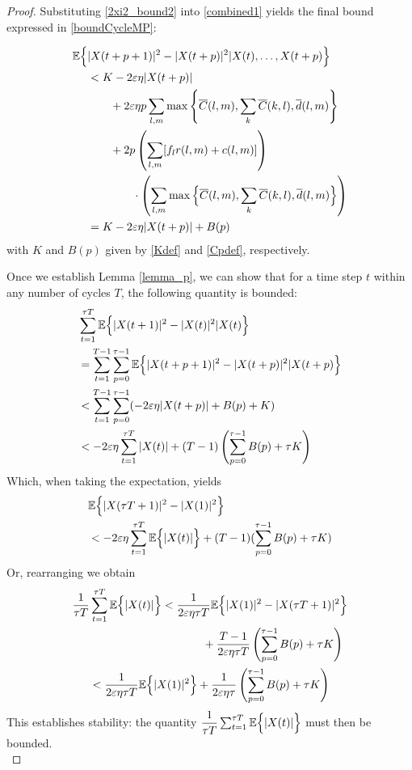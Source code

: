 \begin{proof}
Substituting \eqref{2xi2_bound2} into \eqref{combined1} yields the final bound expressed in
 \eqref{boundCycleMP}:

\begin{align} \nonumber
\mathbb{E}\Big\{ &\vert X(t + p +  1)\vert^2 - \vert  X(t + p)\vert^2 \vert X(t),\ldots,X(t + p) \Big\}  \\ \nonumber
&<  K  -2 \varepsilon \eta \vert X(t + p) \vert \\ \nonumber
&\qquad + 2\varepsilon \eta p \sum_{l,m} \max\left\{ \overline{C}(l,m),\sum_{k}\overline{C}(k,l),\overline d(l,m) \right\}  \\ \nonumber
&  \qquad  + 2 p \left(\sum_{l,m}[f_{l}r(l,m) + c(l,m)]\right) \\ \nonumber
& \qquad \qquad \cdot \left( \sum_{l,m} \max\Big\{  \overline{C}(l,m), \sum_{k}\overline{C}(k,l), \overline{d}(l,m)\Big\} \right) \\
&= K  -2 \varepsilon \eta \vert X(t + p) \vert + B(p)
\end{align}
with $K$ and $B(p)$ given by \eqref{Kdef} and \eqref{Cpdef}, respectively. 



Once we establish Lemma \ref{lemma_p}, we can show that for a time step $t$ within any number of cycles $T$, the following quantity is bounded:
\begin{align} \nonumber 
&\sum_{t = 1}^{\tau T} \expectation{\vert X(t + 1)\vert^2 - \vert X(t)\vert^2 \vert X(t)}\\ \nonumber
&=\sum_{t=1}^{T-1} \sum_{p=0 }^{\tau - 1} \expectation{\vert X(t + p + 1)\vert^2 - \vert X(t + p)\vert^2 \vert X(t + p)}\\ \nonumber
&< \sum_{t=1}^{T-1} \sum_{p=0 }^{\tau - 1} (-2\varepsilon\eta \vert X(t + p )\vert + B(p) + K ) \\
&< -2\varepsilon \eta \sum_{t=1}^{\tau T} \vert X(t )\vert  + (T - 1) \left(\sum_{p=0 }^{\tau - 1} B(p) + \tau K\right) \label{equivalencestabcycleMP}
\end{align}
Which, when taking the expectation, yields
\begin{align} \nonumber 
& \mathbb{E}\Big\{ \vert X(\tau T + 1)\vert^2 - \vert X(1)\vert^2  \Big\} \\
& <  -2\varepsilon\eta \sum_{t=1}^{\tau T} \mathbb{E}\Big\{ \vert X(t )\vert \Big\}+ (T - 1) ( \sum_{p=0 }^{\tau - 1} B(p) + \tau K)
\end{align}
Or, rearranging we obtain
\begin{align} \nonumber 
\dfrac{1}{\tau T}& \sum_{t=1}^{\tau T}  \mathbb{E}\Big\{ \vert X(t )\vert \Big\} < \dfrac{1}{2\varepsilon\eta\tau T}\mathbb{E}\Big\{ \vert X(1)\vert^2 - \vert X(\tau T + 1)\vert^2   \Big\}\\ \nonumber 
&\qquad \qquad \qquad \qquad \qquad + \dfrac{ T -1}{2\varepsilon\eta\tau T} \left(\sum_{p=0 }^{\tau - 1} B(p) + \tau K\right) \\
&< \dfrac{1}{2\varepsilon\eta\tau T}\mathbb{E}\Big\{ \vert X( 1)\vert^2 \Big\}
+ \dfrac{ 1}{2\varepsilon\eta\tau } \left(\sum_{p=0 }^{\tau - 1} B(p) + \tau K\right)
\end{align}
This establishes stability: the quantity $\dfrac{1}{\tau T}\sum_{t=1}^{\tau T} \mathbb{E}\Big\{ \vert X(t )\vert \Big\}$ must then be bounded.\\ 


\end{proof}
